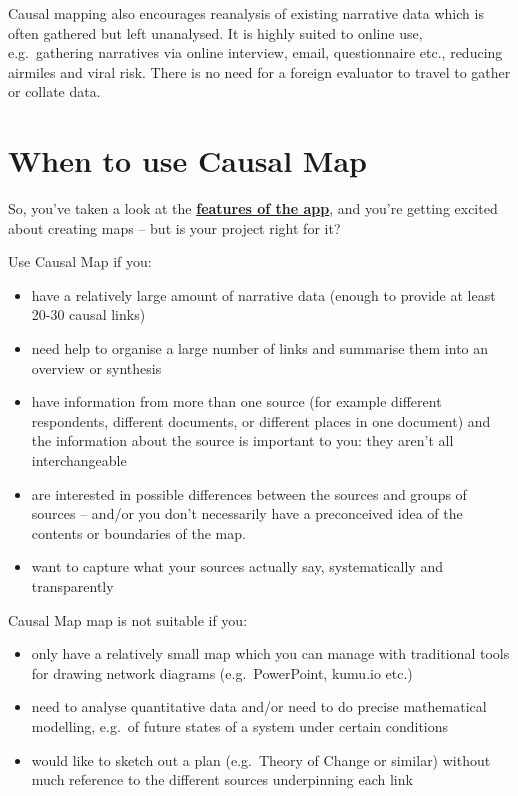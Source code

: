 \documentclass[
]{book}
\providecommand{\tightlist}{%
  \setlength{\itemsep}{0pt}\setlength{\parskip}{0pt}}
\begin{document}
Causal mapping also encourages reanalysis of existing narrative data which is often gathered but left unanalysed. It is highly suited to online use, e.g.~gathering narratives via online interview, email, questionnaire etc., reducing airmiles and viral risk. There is no need for a foreign evaluator to travel to gather or collate data.

\hypertarget{when-to-use-causal-map}{%
\section{When to use Causal Map}\label{when-to-use-causal-map}}

So, you've taken a look at the \href{https://causalmap.app/the-app/}{\textbf{features of the app}}, and you're getting excited about creating maps -- but is your project right for it?

Use Causal Map if you:

\begin{itemize}
\tightlist
\item
  have a relatively large amount of narrative data (enough to provide at least 20-30 causal links)
\item
  need help to organise a large number of links and summarise them into an overview or synthesis
\item
  have information from more than one source (for example different respondents, different documents, or different places in one document) and the information about the source is important to you: they aren't all interchangeable
\item
  are interested in possible differences between the sources and groups of sources -- and/or you don't necessarily have a preconceived idea of the contents or boundaries of the map.
\item
  want to capture what your sources actually say, systematically and transparently
\end{itemize}

Causal Map map is not suitable if you:

\begin{itemize}
\tightlist
\item
  only have a relatively small map which you can manage with traditional tools for drawing network diagrams (e.g.~PowerPoint, kumu.io etc.)
\item
  need to analyse quantitative data and/or need to do precise mathematical modelling, e.g.~of future states of a system under certain conditions
\item
  would like to sketch out a plan (e.g.~Theory of Change or similar) without much reference to the different sources underpinning each link
\end{itemize}
\end{document}
